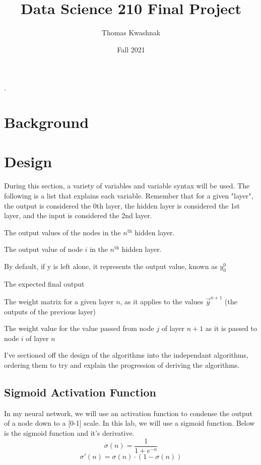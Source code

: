\documentclass[10pt]{article}
\title{Data Science 210 Final Project}
\author{Thomas Kwashnak}
\date{Fall 2021}
\begin{document}
\maketitle
\setlength{\parindent}{0pt}.
\setlength{\parskip}{\baselineskip}
\lstset{numbers=left, numberstyle=\footnotesize, frame=l} 

\tableofcontents
\newpage

\section{Background}
\section{Design}
During this section, a variety of variables and variable syntax will be used. The following is a list that explains each variable. Remember that for a given "layer", the output is considered the 0th layer, the hidden layer is considered the 1st layer, and the input is considered the 2nd layer.
\begin{description}[style=nextline]
    \item[$\vec{y}^n$] The output values of the nodes in the $n^{\text{th}}$ hidden layer. 
    \item[$y^n_i$] The output value of node $i$ in the $n^{\text{th}}$ hidden layer.
    \item[$y$] By default, if y is left alone, it represents the output value, known as $y^0_0$ 
    \item[$\hat{y}$] The expected final output 
    \item[$W^n$] The weight matrix for a given layer $n$, as it applies to the values $\vec{y}^{n+1}$ (the outputs of the previous layer) 
    \item[$w^n_{i,j}$] The weight value for the value passed from node $j$ of layer $n+1$ as it is passed to node $i$ of layer $n$
\end{description}

I've sectioned off the design of the algorithms into the independant algorithms, ordering them to try and explain the progression of deriving the algorithms. 

\subsection{Sigmoid Activation Function}
In my neural network, we will use an activation function to condense the output of a node down to a [0-1] scale. In this lab, we will use a sigmoid function. Below is the sigmoid function and it's derivative.
$$\sigma(n) = \frac{1}{1 + e^{-n}}$$
$$\sigma'(n) = \sigma(n) \cdot (1 - \sigma(n))$$
\end{document}
